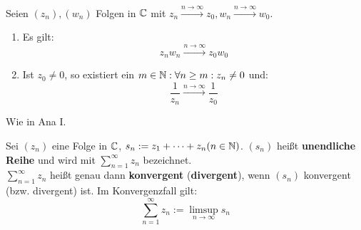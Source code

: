\documentclass[a4paper,twoside,DIV15,BCOR12mm,chapterprefix=true,headings=twolinechapter]{scrbook}
\begin{document}
\begin{satz}
Seien $(z_n),(w_n)$ Folgen in $\mathbb{C}$ mit $z_n\stackrel{n\to\infty}{\to}z_0,
w_n\stackrel{n\to\infty}{\to}w_0$.
\begin{enumerate}
\item Es gilt:
\[z_nw_n\stackrel{n\to\infty}{\to}z_0w_0\]
\item Ist $z_0\ne 0$, so existiert ein $m\in\mathbb{N}:\forall n\ge m:z_n\ne 0$ und:
\[\frac1{z_n}\stackrel{n\to\infty}{\to}\frac1{z_0}\]
\end{enumerate}
\end{satz}

\begin{beweis}
Wie in Ana I.
\end{beweis}

\begin{definition}
Sei $(z_n)$ eine Folge in $\mathbb{C}$, $s_n:=z_1+\cdots+z_n (n\in\mathbb{N})$. $(s_n)$ heißt
\textbf{unendliche Reihe} und wird mit $\sum_{n=1}^{\infty} z_n$ bezeichnet.\\
$\sum_{n=1}^{\infty} z_n$ heißt genau dann \textbf{konvergent} (\textbf{divergent}),
wenn $(s_n)$ konvergent (bzw. divergent) ist. Im Konvergenzfall gilt:
\[\sum_{n=1}^{\infty} z_n:=\limsup_{n\to\infty} s_n\]
\end{definition}
\end{document}

